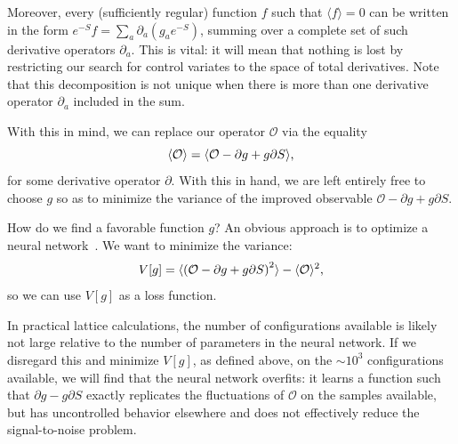 \documentclass[12pt]{article}
\begin{document}
Moreover, every (sufficiently regular) function $f$ such that $\langle f \rangle = 0$ can be written in the form $e^{-S} f = \sum_a \partial_a \left(g_a e^{-S}\right)$, summing over a complete set of such derivative operators $\partial_a$. This is vital: it will mean that nothing is lost by restricting our search for control variates to the space of total derivatives. Note that this decomposition is not unique when there is more than one derivative operator $\partial_a$ included in the sum.

With this in mind, we can replace our operator $\mathcal O$ via the equality
\begin{equation} \label{eq:stein-cv}
\langle \mathcal O \rangle = \langle \mathcal O - \partial g + g \partial S\rangle\text,
\end{equation}
for some derivative operator $\partial$.
With this in hand, we are left entirely free to choose $g$ so as to minimize the variance of the improved observable $\mathcal O - \partial g + g \partial S$. 

How do we find a favorable function $g$? An obvious approach is to optimize a neural network~\cite{Bedaque:2023ovz}. We want to minimize the variance:
\begin{equation}
    V[g] = \langle \left(\mathcal O - \partial g + g \partial S\right)^2 \rangle
    - \langle \mathcal O \rangle^2
    \text,
\end{equation}
so we can use $V[g]$ as a loss function.

In practical lattice calculations, the number of configurations available is likely not large relative to the number of parameters in the neural network. If we disregard this and minimize $V[g]$, as defined above, on the $\sim 10^3$ configurations available, we will find that the neural network overfits: it learns a function such that $\partial g - g \partial S$ exactly replicates the fluctuations of $\mathcal O$ on the samples available, but has uncontrolled behavior elsewhere and does not effectively reduce the signal-to-noise problem.
\end{document}
